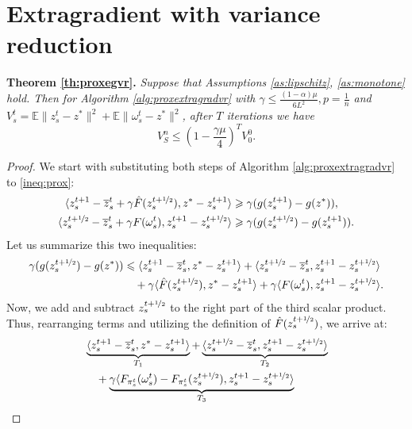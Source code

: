 \documentclass{article}
\begin{document}
\section{Extragradient with variance reduction}
\textbf{Theorem \ref{th:proxegvr}.}
\textit{Suppose that Assumptions \ref{as:lipschitz}, \ref{as:monotone} hold. Then for Algorithm \ref{alg:proxextragradvr} with $\gamma \leqslant\frac{(1-\alpha)\mu}{6L^2}, p = \frac{1}{n}$ and $V_s^t =\mathbb E \|z_s^t - z^*\|^2 + \mathbb E\|\omega_s^t - z^*\|^2$, after $T$ iterations we have}
    \begin{equation*}
        V_S^n \leqslant \left(1 - \frac{\gamma\mu}{4}\right)^T V_0^0.
    \end{equation*}
\begin{proof}
    We start with substituting both steps of Algorithm \ref{alg:proxextragradvr} to \eqref{ineq:prox}:
        \begin{align*}
            \langle z_s^{t+1} - \overline{z}_s^t + \gamma \hat{F}(z_s^{t+\nicefrac{1}{2}}), z^* - z_s^{t+1}\rangle &\geqslant \gamma (g(z_s^{t+1}) - g(z^*)),\\
            \langle z_s^{t+\nicefrac{1}{2}} - \overline{z}_s^t + \gamma F(\omega_s^t), z_s^{t+1} - z_s^{t+\nicefrac{1}{2}}\rangle &\geqslant \gamma (g(z_s^{t+\nicefrac{1}{2}}) - g(z_s^{t+1})).
        \end{align*}
        Let us summarize this two inequalities:
        \begin{align*}
        \gamma (g(z_s^{t+\nicefrac{1}{2}}) - g(z^*)) &\leqslant
            \langle z_s^{t+1} - \overline{z}_s^t, z^* - z_s^{t+1}\rangle+ \langle z_s^{t+\nicefrac{1}{2}} - \overline{z}_s^t, z_s^{t+1} - z_s^{t+\nicefrac{1}{2}}\rangle\\
            & \quad + \gamma\langle \hat{F}(z_s^{t+\nicefrac{1}{2}}), z^* - z_s^{t+1}\rangle + \gamma\langle F(\omega_s^t), z_s^{t+1} - z_s^{t+\nicefrac{1}{2}}\rangle .
        \end{align*}
        Now, we add and subtract $z_s^{t+\nicefrac{1}{2}}$ to the right part of the third scalar product. Thus, rearranging terms and utilizing the definition of $\hat{F}(z_s^{t+\nicefrac{1}{2}})$, we arrive at:
        \begin{align}
            \notag
            &\underbrace{\langle z_s^{t+1} - \overline{z}_s^t, z^* - z_s^{t+1}\rangle}_{T_1} + \underbrace{\langle z_s^{t+\nicefrac{1}{2}} - \overline{z}_s^t, z_s^{t+1} - z_s^{t+\nicefrac{1}{2}}\rangle}_{T_2}\\
            \notag
            &\quad + \underbrace{\gamma\langle F_{\pi_s^t}(\omega_s^t) - F_{\pi_s^t}(z_s^{t+\nicefrac{1}{2}}), z_s^{t+1} - z_s^{t+\nicefrac{1}{2}}\rangle}_{T_3} \\

\end{align}
\end{proof}
\end{document}
